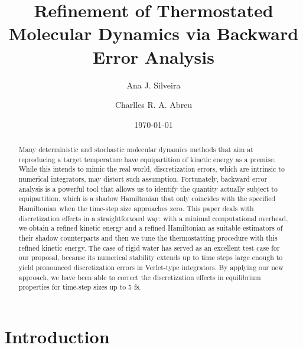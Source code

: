 \documentclass[
	aip,
	jcp,
	reprint,
]{revtex4-1}
\begin{document}
\author{Ana J. Silveira}

\author{Charlles R. A. Abreu}

\title{Refinement of Thermostated Molecular Dynamics via Backward Error Analysis}


\date{\today}

\begin{abstract}
Many deterministic and stochastic molecular dynamics methods that aim at reproducing a target temperature have equipartition of kinetic energy as a premise.
While this intends to mimic the real world, discretization errors, which are intrinsic to numerical integrators, may distort such assumption.
Fortunately, backward error analysis is a powerful tool that allows us to identify the quantity actually subject to equipartition, which is a shadow Hamiltonian that only coincides with the specified Hamiltonian when the time-step size approaches zero.
This paper deals with discretization effects in a straightforward way: with a minimal computational overhead, we obtain a refined kinetic energy and a refined Hamiltonian as suitable estimators of their
shadow counterparts and then we tune the thermostatting procedure with this refined kinetic energy.
The case of rigid water has served as an excellent test case for our proposal, because its numerical stability extends up to time steps large enough to yield pronounced discretization errors in Verlet-type integrators.
By applying our new approach, we have been able to correct the discretization effects in equilibrium properties for time-step sizes up to 5 fs.
\end{abstract}

\maketitle

\section{Introduction}
\end{document}
